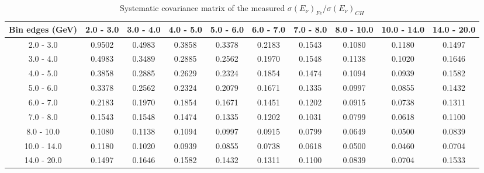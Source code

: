 \documentclass[aps,prl,twocolumn,superscriptaddress,nofootinbib]{revtex4-1}
\begin{document}
\begin{table}[h!]
  \centering
  \caption{Systematic covariance matrix of the measured $\sigma(E_{\nu})_{Fe}/\sigma(E_{\nu})_{CH}$}
    \begin{tabular}{c||ccccccccc}
      Bin edges (GeV) & 2.0 - 3.0 & 3.0 - 4.0 & 4.0 - 5.0 & 5.0 - 6.0 & 6.0 - 7.0 & 7.0 - 8.0 & 8.0 - 10.0 & 10.0 - 14.0 & 14.0 - 20.0 \\
\hline \hline
        2.0 - 3.0 &  0.9502 &  0.4983 &  0.3858 &  0.3378 &  0.2183 &  0.1543 &  0.1080 &  0.1180 &  0.1497 \\
        3.0 - 4.0 &  0.4983 &  0.3489 &  0.2885 &  0.2562 &  0.1970 &  0.1548 &  0.1138 &  0.1020 &  0.1646 \\
        4.0 - 5.0 &  0.3858 &  0.2885 &  0.2629 &  0.2324 &  0.1854 &  0.1474 &  0.1094 &  0.0939 &  0.1582 \\
        5.0 - 6.0 &  0.3378 &  0.2562 &  0.2324 &  0.2079 &  0.1671 &  0.1335 &  0.0997 &  0.0855 &  0.1432 \\
        6.0 - 7.0 &  0.2183 &  0.1970 &  0.1854 &  0.1671 &  0.1451 &  0.1202 &  0.0915 &  0.0738 &  0.1311 \\
        7.0 - 8.0 &  0.1543 &  0.1548 &  0.1474 &  0.1335 &  0.1202 &  0.1031 &  0.0799 &  0.0618 &  0.1100 \\
       8.0 - 10.0 &  0.1080 &  0.1138 &  0.1094 &  0.0997 &  0.0915 &  0.0799 &  0.0649 &  0.0500 &  0.0839 \\
      10.0 - 14.0 &  0.1180 &  0.1020 &  0.0939 &  0.0855 &  0.0738 &  0.0618 &  0.0500 &  0.0460 &  0.0704 \\
      14.0 - 20.0 &  0.1497 &  0.1646 &  0.1582 &  0.1432 &  0.1311 &  0.1100 &  0.0839 &  0.0704 &  0.1533 \\
    \end{tabular}
  \label{tablecov:Fe_Systematic_Enu}
\end{table}
\end{document}

